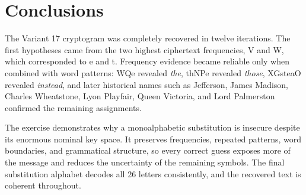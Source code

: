 \documentclass[12pt,a4paper]{article}
\begin{document}
\section{Conclusions}

The Variant 17 cryptogram was completely recovered in twelve iterations. The first hypotheses came from the two highest ciphertext frequencies, V and W, which corresponded to e and t. Frequency evidence became reliable only when combined with word patterns: WQe revealed \textit{the}, thNPe revealed \textit{those}, XGsteaO revealed \textit{instead}, and later historical names such as Jefferson, James Madison, Charles Wheatstone, Lyon Playfair, Queen Victoria, and Lord Palmerston confirmed the remaining assignments.

The exercise demonstrates why a monoalphabetic substitution is insecure despite its enormous nominal key space. It preserves frequencies, repeated patterns, word boundaries, and grammatical structure, so every correct guess exposes more of the message and reduces the uncertainty of the remaining symbols. The final substitution alphabet decodes all 26 letters consistently, and the recovered text is coherent throughout.
\end{document}
